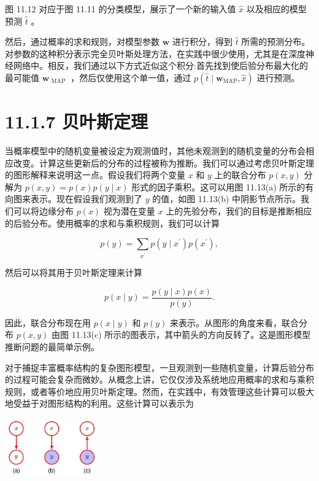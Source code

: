 \documentclass[10pt]{article}
\begin{document}
图 11.12 对应于图 11.11 的分类模型，展示了一个新的输入值 \(\widehat{x}\) 以及相应的模型预测 \(\widehat{t}\) 。

然后，通过概率的求和规则，对模型参数 \(\mathbf{w}\) 进行积分，得到 \(\widehat{t}\) 所需的预测分布。对参数的这种积分表示完全贝叶斯处理方法，在实践中很少使用，尤其是在深度神经网络中。相反，我们通过以下方式近似这个积分:首先找到使后验分布最大化的最可能值 \({\mathbf{w}}_{\text{ MAP }}\) ，然后仅使用这个单一值，通过 \(p\left( {\widehat{t} \mid  {\mathbf{w}}_{\mathrm{{MAP}}},\widehat{x}}\right)\) 进行预测。

\section*{11.1.7 贝叶斯定理}

当概率模型中的随机变量被设定为观测值时，其他未观测到的随机变量的分布会相应改变。计算这些更新后的分布的过程被称为推断。我们可以通过考虑贝叶斯定理的图形解释来说明这一点。假设我们将两个变量 \(x\) 和 \(y\) 上的联合分布 \(p\left( {x,y}\right)\) 分解为 \(p\left( {x,y}\right)  = p\left( x\right) p\left( {y \mid  x}\right)\) 形式的因子乘积。这可以用图 11.13(a) 所示的有向图来表示。现在假设我们观测到了 \(y\) 的值，如图 11.13(b) 中阴影节点所示。我们可以将边缘分布 \(p\left( x\right)\) 视为潜在变量 \(x\) 上的先验分布，我们的目标是推断相应的后验分布。使用概率的求和与乘积规则，我们可以计算

\[
p\left( y\right)  = \mathop{\sum }\limits_{{x}^{\prime }}p\left( {y \mid  {x}^{\prime }}\right) p\left( {x}^{\prime }\right) , \tag{11.20}
\]

然后可以将其用于贝叶斯定理来计算

\[
p\left( {x \mid  y}\right)  = \frac{p\left( {y \mid  x}\right) p\left( x\right) }{p\left( y\right) }. \tag{11.21}
\]

因此，联合分布现在用 \(p\left( {x \mid  y}\right)\) 和 \(p\left( y\right)\) 来表示。从图形的角度来看，联合分布 \(p\left( {x,y}\right)\) 由图 11.13(c) 所示的图表示，其中箭头的方向反转了。这是图形模型推断问题的最简单示例。

对于捕捉丰富概率结构的复杂图形模型，一旦观测到一些随机变量，计算后验分布的过程可能会复杂而微妙。从概念上讲，它仅仅涉及系统地应用概率的求和与乘积规则，或者等价地应用贝叶斯定理。然而，在实践中，有效管理这些计算可以极大地受益于对图形结构的利用。这些计算可以表示为

\begin{center}
\includegraphics[max width=0.3\textwidth]{images/0194e279-9b28-703a-88f4-c3ac21e2010d_356_956_344_419_262_0.jpg}
\end{center}
\hspace*{3em} 
\end{document}
